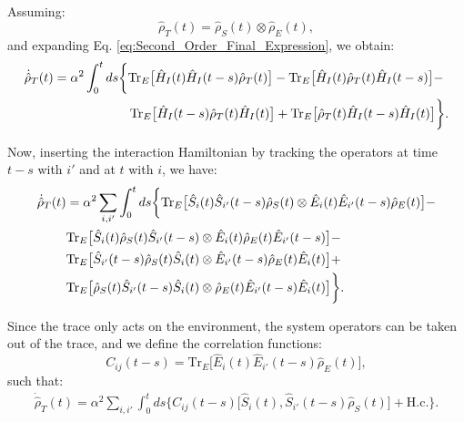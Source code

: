 Assuming:
\begin{equation}
    \hat{\rho}_T(t) = \hat{\rho}_S(t) \otimes \hat{\rho}_E(t),
    \label{eq:Reduced_Density_Matrix_Assumption}
\end{equation}
and expanding Eq. \eqref{eq:Second_Order_Final_Expression}, we obtain:
\begin{align}
    \dot{\hat{\rho}}_T(t) &=  \alpha^2 \int_0^t ds 
    \bigg\{ 
        \mathrm{Tr}_E \big[ \hat{H}_I(t) \hat{H}_I(t-s) \hat{\rho}_T(t) \big] - 
        \mathrm{Tr}_E \big[ \hat{H}_I(t) \hat{\rho}_T(t) \hat{H}_I(t-s) \big] - \notag \\ 
        &\qquad \qquad \qquad
        \mathrm{Tr}_E \big[ \hat{H}_I(t-s) \hat{\rho}_T(t) \hat{H}_I(t) \big] + 
        \mathrm{Tr}_E \big[ \hat{\rho}_T(t) \hat{H}_I(t-s) \hat{H}_I(t) \big] 
    \bigg\}.
    \label{eq:Expanded_Second_Order_Expression}
\end{align}

Now, inserting the interaction Hamiltonian by tracking the operators at time $t - s$ with $i'$ and at $t$ with $i$, we have:
\begin{align}
    \dot{\hat{\rho}}_T(t) &= \alpha^2  \sum_{i, i'} \int_0^t ds 
    \bigg\{
              \mathrm{Tr}_E \big[ \hat{S}_i(t) \hat{S}_{i'}(t-s) \hat{\rho}_S(t)      \otimes   \hat{E}_{i}(t) \hat{E}_{i'}(t-s) \hat{\rho}_E(t)  \big] -  \notag \\ 
            & \mathrm{Tr}_E \big[ \hat{S}_i(t) \hat{\rho}_S(t) \hat{S}_{i'}(t-s)      \otimes   \hat{E}_{i}(t) \hat{\rho}_E(t) \hat{E}_{i'}(t-s)  \big] - \notag \\ 
            & \mathrm{Tr}_E \big[ \hat{S}_{i'}(t-s) \hat{\rho}_S(t) \hat{S}_i(t)      \otimes   \hat{E}_{i'}(t-s) \hat{\rho}_E(t) \hat{E}_{i}(t)  \big] +  \notag \\ 
            & \mathrm{Tr}_E \big[ \hat{\rho}_S(t) \hat{S}_{i'}(t-s) \hat{S}_i(t)      \otimes   \hat{\rho}_E(t) \hat{E}_{i'}(t-s) \hat{E}_{i}(t)  \big] 
    \bigg\}.
    \label{eq:Interaction_Hamiltonian_Expansion}
\end{align}

Since the trace only acts on the environment, the system operators can be taken out of the trace, and we define the correlation functions:
\begin{equation}
    C_{ij}(t - s) = \mathrm{Tr}_E \big[\hat{E}_{i}(t) \hat{E}_{i'}(t-s) \hat{\rho}_E(t)\big],
    \label{eq:Environment_Correlation_Function}
\end{equation}
such that:
\begin{align}
    \dot{\hat{\rho}}_T(t) = \alpha^2  \sum_{i, i'} \int_0^t ds 
    \bigg\{
            C_{ij}(t - s) \big[ \hat{S}_i(t),  \hat{S}_{i'}(t-s) \hat{\rho}_S(t) \big] + \text{H.c.} 
    \bigg\}.
    \label{eq:Redfield_Equation_Final}
\end{align}
